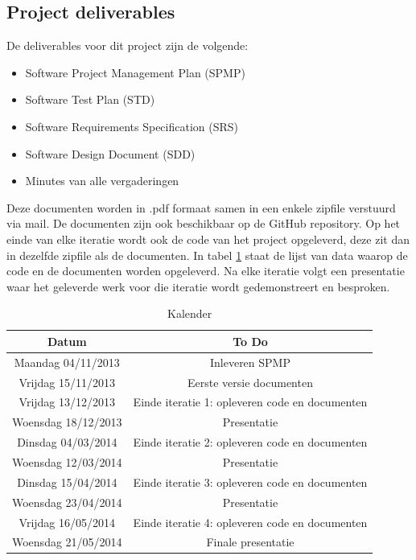 \subsection{Project deliverables}
De deliverables voor dit project zijn de volgende:
\begin{itemize}
	\item Software Project Management Plan (SPMP)
	\item Software Test Plan (STD)
	\item Software Requirements Specification (SRS)
	\item Software Design Document (SDD)
	\item Minutes van alle vergaderingen
\end{itemize}
Deze documenten worden in .pdf formaat samen in een enkele zipfile verstuurd via mail. De documenten zijn ook beschikbaar op de GitHub repository. Op het einde van elke iteratie wordt ook de code van het project opgeleverd, deze zit dan in dezelfde zipfile als de documenten. In tabel \ref{tab:kalender} staat de lijst van data waarop de code en de documenten worden opgeleverd. Na elke iteratie volgt een presentatie waar het geleverde werk voor die iteratie wordt gedemonstreert en besproken. 
\begin{table}[H]
  \centering
  \caption{Kalender}
    \begin{tabular}{c|c}
    \textbf{Datum} & \textbf{To Do} \\
    \hline
    Maandag 04/11/2013 & Inleveren SPMP \\
    Vrijdag 15/11/2013 & Eerste versie documenten \\
    Vrijdag 13/12/2013 & Einde iteratie 1: opleveren code en documenten \\
    Woensdag 18/12/2013 & Presentatie \\
    \hline
    \hline
    Dinsdag 04/03/2014 & Einde iteratie 2: opleveren code en documenten \\
    Woensdag 12/03/2014 & Presentatie \\
    Dinsdag 15/04/2014 & Einde iteratie 3: opleveren code en documenten \\
    Woensdag 23/04/2014 & Presentatie \\
    Vrijdag 16/05/2014 & Einde iteratie 4: opleveren code en documenten \\
    Woensdag 21/05/2014 & Finale presentatie \\
    \end{tabular}
  \label{tab:kalender}
\end{table}

